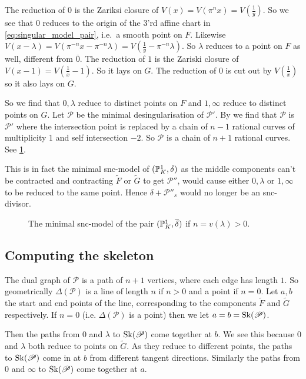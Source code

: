The reduction of $0$ is the Zariksi closure of $V(x) = V(\pi ^{n} x ) = V(\frac{1}{y})$. 
So we see that $0$ reduces to the origin of the 3'rd affine chart in \eqref{eq:singular_model_pair}, i.e.\ a smooth point on $F$. 
Likewise  $V(x - \lambda) = V(\pi^{-n} x - \pi^{-n}\lambda) = V(\frac{1}{y} - \pi^{-n}\lambda)$. 
So $\lambda$ reduces to a point on $F$ as well, different from $\overline{0}$.
The reduction of $1$ is the Zariski closure of $V(x-1) = V(\frac{1}{x} - 1)$. 
So it lays on $G$. The reduction of $0$ is cut out by $V(\frac{1}{x})$ so it also lays on $G$. 

So we find that $0, \lambda$ reduce to distinct points on $F$ and $1, \infty$ reduce to distinct points on $G$. 
Let $\mathscr P$ be the minimal desingularisation of $\mathscr P'$. 
By \cite[cor.\ 9.3.25]{liuAlgebraicGeometryArithmetic2002} we find that $\mathscr P$ is $\mathscr P'$ where the intersection point is replaced by a chain of $n-1$ rational curves of multiplicity 1 and self intersection $-2$.  
So $\mathscr P$ is a chain of $n + 1$ rational curves. See \cref{fig:model_of_the_pair}. 

This is in fact the minimal snc-model of $(\mathbb{P}^{1}_K, \delta)$ as the middle components can't be contracted and contracting $\tilde F$ or $\tilde G$ to get $\mathscr P''$, would cause either $0, \lambda$ or $1, \infty$ to be reduced to the same point. Hence $\delta + \mathscr P''_s$ would no longer be an snc-divisor. 
\begin{figure}[h]
    \centering
    \caption{The minimal snc-model of the pair $(\mathbb{P}^{1}_K, \overline{\delta})$ if $n =v(\lambda) > 0$. }
    \label{fig:model_of_the_pair}
\end{figure}

\subsection{Computing the skeleton} \label{sec:computing_the_skeleton}

The dual graph of $\mathscr P$ is a path of $n + 1$ vertices, where each edge has length $1$. 
So geometrically $\Delta(\mathscr P)$ is a line of length $n$ if $n > 0$ and a point if $n = 0$.
Let $a, b$ the start and end points of the line, corresponding to the components $\tilde F$ and $\tilde G$ respectively. If $n = 0$ (i.e. $\Delta(\mathscr P)$ is a point) then we let $a = b = \operatorname{Sk}(\mathscr P)$. 

Then the paths from $0$ and  $\lambda$ to $\operatorname{Sk}(\mathscr P)$ come together at $b$. We see this because $0$ and $\lambda$ both reduce to points on $\tilde G$. 
As they reduce to different points, the paths to $\operatorname{Sk}(\mathscr P)$ come in at $b$ from different tangent directions. 
Similarly the paths from $0$ and $\infty$ to $\operatorname{Sk}(\mathscr P)$ come together at $a$.

